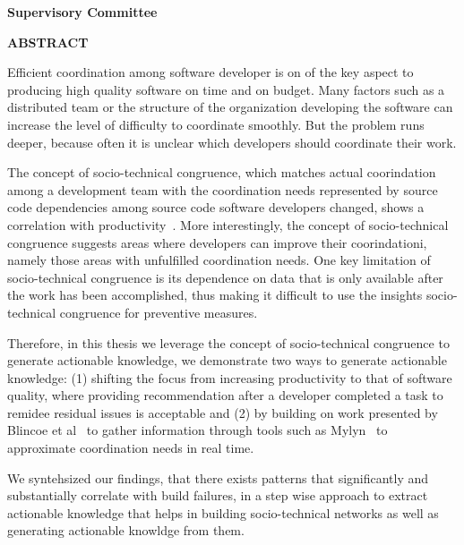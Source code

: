 \newpage
{}

\noindent \textbf{Supervisory Committee}
\tpbreak
\panel

\begin{center}
\textbf{ABSTRACT}
\end{center}
Efficient coordination among software developer is on of the key aspect to producing high quality software on time and on budget.
Many factors such as a distributed team or the structure of the organization developing the software can increase the level of difficulty to coordinate smoothly.
But the problem runs deeper, because often it is unclear which developers should coordinate their work.

The concept of socio-technical congruence, which matches actual coorindation among a development team with the coordination needs represented by source code dependencies among source code software developers changed, shows a correlation with productivity~\cite{cataldo:cscw:2006}.
More interestingly, the concept of socio-technical congruence suggests areas where developers can improve their coorindationi, namely those areas with unfulfilled coordination needs.
One key limitation of socio-technical congruence is its dependence on data that is only available after the work has been accomplished, thus making it difficult to use the insights socio-technical congruence for preventive measures.

Therefore, in this thesis we leverage the concept of socio-technical congruence to generate actionable knowledge, we demonstrate two ways to generate actionable knowledge: (1) shifting the focus from increasing productivity to that of software quality, where providing recommendation after a developer completed a task to remidee residual issues is acceptable and (2) by building on work presented by Blincoe et al~\cite{blincoe:cscw:2012} to gather information through tools such as Mylyn~\cite{kersten:aosd:2005} to approximate coordination needs in real time.

We syntehsized our findings, that there exists patterns that significantly and substantially correlate with build failures, in a step wise approach to extract actionable knowledge that helps in building socio-technical networks as well as generating actionable knowldge from them.
